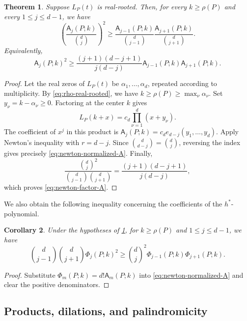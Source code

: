 \documentclass[reqno, 12pt]{article}
\numberwithin{equation}{section}
\newtheorem{theorem}{Theorem}[section]
\newtheorem{corollary}[theorem]{Corollary}
\theoremstyle{definition}
\newcommand{\A}{\mathsf{A}}
\begin{document}
\begin{theorem}\label{thm:newton-shifted}
Suppose $L_P(t)$ is real-rooted.  Then, for every $k\geq\rho(P)$ and every $1\leq j\leq d-1$, we have 
\begin{equation}\label{eq:newton-normalized-A}
\left(\frac{\A_j(P;k)}{\binom dj}\right)^2\geq\frac{\A_{j-1}(P;k)}{\binom d{j-1}}\frac{\A_{j+1}(P;k)}{\binom d{j+1}}.
\end{equation}
Equivalently,
\begin{equation}\label{eq:newton-factor-A}
\A_j(P;k)^2\geq\frac{(j+1)(d-j+1)}{j(d-j)}\A_{j-1}(P;k)\A_{j+1}(P;k).
\end{equation}
\end{theorem}
\begin{proof}
Let the real zeros of $L_P(t)$ be $\alpha_1,\ldots,\alpha_d$, repeated according to multiplicity.  By \eqref{eq:rho-real-rooted}, we have $k\geq\rho(P)\geq\max_\nu\alpha_\nu$.
Set $y_\nu=k-\alpha_\nu\geq0$.  Factoring at the center $k$ gives
\[L_P(k+x)=c_d\prod_{\nu=1}^{d}(x+y_\nu).
\]
The coefficient of $x^j$ in this product is $\A_j(P;k)=c_de_{d-j}(y_1,\ldots,y_d)$.
Apply Newton's inequality with $r=d-j$.  Since $\binom d{d-j}=\binom dj$, reversing the index gives precisely \eqref{eq:newton-normalized-A}. Finally,
\[\frac{\binom dj^2}{\binom d{j-1}\binom d{j+1}}=\frac{(j+1)(d-j+1)}{j(d-j)},
\]
which proves \eqref{eq:newton-factor-A}.
\end{proof}

We also obtain the following inequality concerning the coefficients of the $h^*$-polynomial.

\begin{corollary}\label{cor:newton-hstar}
Under the hypotheses of \cref{thm:newton-shifted}, for $k\geq\rho(P)$ and $1\leq j\leq d-1$, we have 
\begin{equation*}
\binom d{j-1}\binom d{j+1}\Phi_j(P;k)^2\geq\binom dj^2\Phi_{j-1}(P;k)\Phi_{j+1}(P;k).
\end{equation*}
\end{corollary}
\begin{proof}
Substitute $\Phi_m(P;k)=d!\A_m(P;k)$ into \eqref{eq:newton-normalized-A} and clear the positive denominators.
\end{proof}


\subsection{Products, dilations, and palindromicity}\label{Subsection-PDP-prob}
\end{document}
